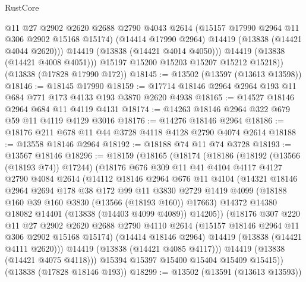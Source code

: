\begin{lexlean}{RustCore}
\begin{coremodule}
              @11
              @27
              @2902
              @2620
              @2688
              @2790
              @4043
              @2614
              (@15157 @17990 @2964 @11 @306 @2902 @15168 @15174)
              (@14414 @17990 @2964)
              @14419
              (@13838 (@14421 @4044 @2620)))
            @14419
            (@13838 (@14421 @4014 @4050)))
          @14419
          (@13838 (@14421 @4008 @4051)))
        @15197
        @15200
        @15203
        @15207
        @15212
        @15218))
    (@13838 (@17828 @17990 @172))
@18145 := @13502 (@13597 (@13613 @13598))
@18146 := @18145 @17990
@18159 := @17714 @18146 @2964 @2964 @193 @11 @684 @771 @173 @4133 @193 @3870 @2620 @4938
@18165 := @14527 @18146 @2964 @684 @11 @4119 @4131
@18174 := @14263 @18146 @2964 @322 @679 @59 @11 @4119 @4129 @3016
@18176 := @14276 @18146 @2964
@18186 := @18176 @211 @678 @11 @44 @3728 @4118 @4128 @2790 @4074 @2614
@18188 := @13558 @18146 @2964
@18192 := @18188 @74 @11 @74 @3728
@18193 := @13567 @18146
@18296 := @18159
    (@18165
      (@18174
        (@18186
          (@18192 (@13566 (@18193 @74)) @17244)
          (@18176
            @676
            @309
            @11
            @41
            @4104
            @4117
            @4127
            @2790
            @4084
            @2614
            (@14112
              @18146
              @2964
              @676
              @11
              @4104
              (@14321
                @18146
                @2964
                @2694
                @178
                @38
                @172
                @99
                @11
                @3830
                @2729
                @1419
                @4099
                (@18188 @160 @39 @160 @3830 (@13566 (@18193 @160)) @17663)
                @14372
                @14380
                @18082
                @14401
                (@13838 (@14403 @4099 @4089))
                @14205))
            (@18176
              @307
              @220
              @11
              @27
              @2902
              @2620
              @2688
              @2790
              @4110
              @2614
              (@15157 @18146 @2964 @11 @306 @2902 @15168 @15174)
              (@14414 @18146 @2964)
              @14419
              (@13838 (@14421 @4111 @2620)))
            @14419
            (@13838 (@14421 @4085 @4117)))
          @14419
          (@13838 (@14421 @4075 @4118)))
        @15394
        @15397
        @15400
        @15404
        @15409
        @15415))
    (@13838 (@17828 @18146 @193))
@18299 := @13502 (@13591 (@13613 @13593))

\end{coremodule}
\end{lexlean}
